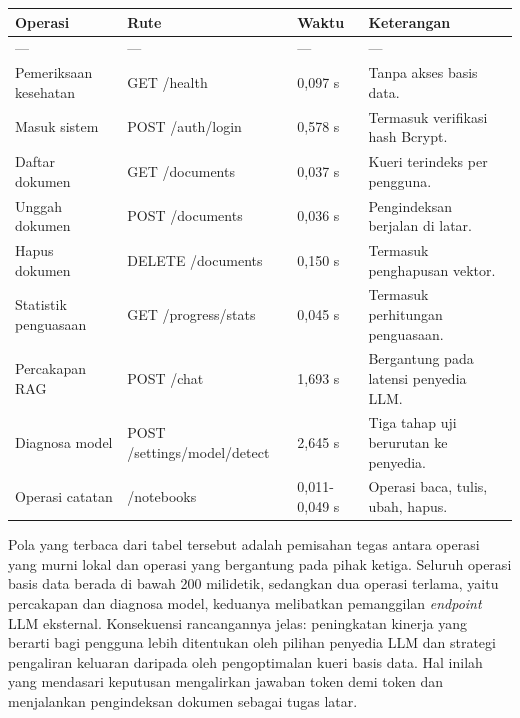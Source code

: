 \documentclass[12pt,a4paper]{article}
\begin{document}
\begin{table}[h]

\centering

\begin{tabular}{llll}

\toprule

Operasi & Rute & Waktu & Keterangan \\

\midrule

--- & --- & --- & --- \\

Pemeriksaan kesehatan & GET /health & 0,097 s & Tanpa akses basis data. \\

Masuk sistem & POST /auth/login & 0,578 s & Termasuk verifikasi hash Bcrypt. \\

Daftar dokumen & GET /documents & 0,037 s & Kueri terindeks per pengguna. \\

Unggah dokumen & POST /documents & 0,036 s & Pengindeksan berjalan di latar. \\

Hapus dokumen & DELETE /documents & 0,150 s & Termasuk penghapusan vektor. \\

Statistik penguasaan & GET /progress/stats & 0,045 s & Termasuk perhitungan penguasaan. \\

Percakapan RAG & POST /chat & 1,693 s & Bergantung pada latensi penyedia LLM. \\

Diagnosa model & POST /settings/model/detect & 2,645 s & Tiga tahap uji berurutan ke penyedia. \\

Operasi catatan & /notebooks & 0,011-0,049 s & Operasi baca, tulis, ubah, hapus. \\

\bottomrule

\end{tabular}

\end{table}

Pola yang terbaca dari tabel tersebut adalah pemisahan tegas antara operasi yang murni lokal dan operasi yang bergantung pada pihak ketiga. Seluruh operasi basis data berada di bawah 200 milidetik, sedangkan dua operasi terlama, yaitu percakapan dan diagnosa model, keduanya melibatkan pemanggilan \textit{endpoint} LLM eksternal. Konsekuensi rancangannya jelas: peningkatan kinerja yang berarti bagi pengguna lebih ditentukan oleh pilihan penyedia LLM dan strategi pengaliran keluaran daripada oleh pengoptimalan kueri basis data. Hal inilah yang mendasari keputusan mengalirkan jawaban token demi token dan menjalankan pengindeksan dokumen sebagai tugas latar.
\end{document}
